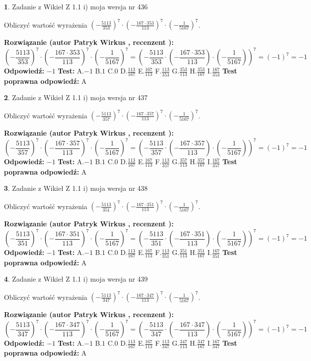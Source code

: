 \documentclass[12pt, a4paper]{article}
\theoremstyle{definition} %
\newtheorem{zad}{}
\newcommand{\zadStart}[1]{\begin{zad}#1\newline}
\newcommand{\zadStop}{\end{zad}}
\newcommand{\rozwStart}[2]{\noindent \textbf{Rozwiązanie (autor #1 , recenzent #2): }\newline}
\newcommand{\rozwStop}{\newline}
\newcommand{\odpStart}{\noindent \textbf{Odpowiedź:}\newline}
\newcommand{\odpStop}{\newline}
\newcommand{\testStart}{\noindent \textbf{Test:}\newline}
\newcommand{\testStop}{\newline}
\newcommand{\kluczStart}{\noindent \textbf{Test poprawna odpowiedź:}\newline}
\newcommand{\kluczStop}{\newline}
\begin{document}
\zadStart{Zadanie z Wikieł Z 1.1 i) moja wersja nr 436}

Obliczyć wartość wyrażenia $(-\frac{5113}{353})^{7} \cdot (-\frac{167 \cdot 353}{113})^{7} \cdot (-\frac{1}{5167})^{7}$.
\zadStop
\rozwStart{Patryk Wirkus}{}
$$(-\frac{5113}{353})^{7} \cdot (-\frac{167 \cdot 353}{113})^{7} \cdot (-\frac{1}{5167})^{7} = (-\frac{5113}{353} \cdot (-\frac{167 \cdot 353}{113}) \cdot (-\frac{1}{5167}))^{7} = (-1)^{7} = -1$$
\rozwStop
\odpStart
$-1$
\odpStop
\testStart
A.$-1$ B.$1$ C.$0$ D.$\frac{113}{167}$ E.$\frac{167}{113}$
F.$\frac{113}{353}$ G.$\frac{353}{113}$
H.$\frac{353}{167}$
I.$\frac{167}{353}$
\testStop
\kluczStart
A
\kluczStop



\zadStart{Zadanie z Wikieł Z 1.1 i) moja wersja nr 437}

Obliczyć wartość wyrażenia $(-\frac{5113}{357})^{7} \cdot (-\frac{167 \cdot 357}{113})^{7} \cdot (-\frac{1}{5167})^{7}$.
\zadStop
\rozwStart{Patryk Wirkus}{}
$$(-\frac{5113}{357})^{7} \cdot (-\frac{167 \cdot 357}{113})^{7} \cdot (-\frac{1}{5167})^{7} = (-\frac{5113}{357} \cdot (-\frac{167 \cdot 357}{113}) \cdot (-\frac{1}{5167}))^{7} = (-1)^{7} = -1$$
\rozwStop
\odpStart
$-1$
\odpStop
\testStart
A.$-1$ B.$1$ C.$0$ D.$\frac{113}{167}$ E.$\frac{167}{113}$
F.$\frac{113}{357}$ G.$\frac{357}{113}$
H.$\frac{357}{167}$
I.$\frac{167}{357}$
\testStop
\kluczStart
A
\kluczStop



\zadStart{Zadanie z Wikieł Z 1.1 i) moja wersja nr 438}

Obliczyć wartość wyrażenia $(-\frac{5113}{351})^{7} \cdot (-\frac{167 \cdot 351}{113})^{7} \cdot (-\frac{1}{5167})^{7}$.
\zadStop
\rozwStart{Patryk Wirkus}{}
$$(-\frac{5113}{351})^{7} \cdot (-\frac{167 \cdot 351}{113})^{7} \cdot (-\frac{1}{5167})^{7} = (-\frac{5113}{351} \cdot (-\frac{167 \cdot 351}{113}) \cdot (-\frac{1}{5167}))^{7} = (-1)^{7} = -1$$
\rozwStop
\odpStart
$-1$
\odpStop
\testStart
A.$-1$ B.$1$ C.$0$ D.$\frac{113}{167}$ E.$\frac{167}{113}$
F.$\frac{113}{351}$ G.$\frac{351}{113}$
H.$\frac{351}{167}$
I.$\frac{167}{351}$
\testStop
\kluczStart
A
\kluczStop



\zadStart{Zadanie z Wikieł Z 1.1 i) moja wersja nr 439}

Obliczyć wartość wyrażenia $(-\frac{5113}{347})^{7} \cdot (-\frac{167 \cdot 347}{113})^{7} \cdot (-\frac{1}{5167})^{7}$.
\zadStop
\rozwStart{Patryk Wirkus}{}
$$(-\frac{5113}{347})^{7} \cdot (-\frac{167 \cdot 347}{113})^{7} \cdot (-\frac{1}{5167})^{7} = (-\frac{5113}{347} \cdot (-\frac{167 \cdot 347}{113}) \cdot (-\frac{1}{5167}))^{7} = (-1)^{7} = -1$$
\rozwStop
\odpStart
$-1$
\odpStop
\testStart
A.$-1$ B.$1$ C.$0$ D.$\frac{113}{167}$ E.$\frac{167}{113}$
F.$\frac{113}{347}$ G.$\frac{347}{113}$
H.$\frac{347}{167}$
I.$\frac{167}{347}$
\testStop
\kluczStart
A
\kluczStop
\end{document}
